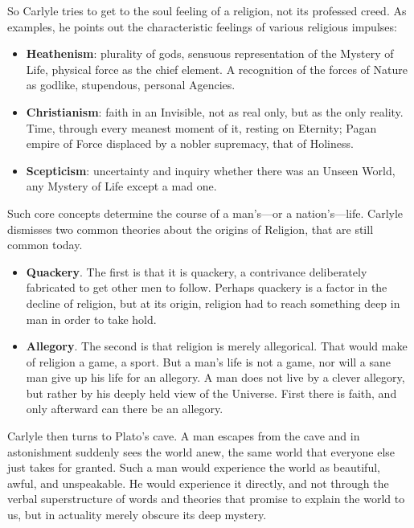 So Carlyle tries to get to the soul feeling of a religion, not its professed creed. As examples, he points out the characteristic feelings of various religious impulses:

\begin{itemize}


\item \textbf{Heathenism}: plurality of gods, sensuous representation of the Mystery of Life, physical force as the chief element. A recognition of the forces of Nature as godlike, stupendous, personal Agencies.

\item \textbf{Christianism}: faith in an Invisible, not as real only, but as the only reality. Time, through every meanest moment of it, resting on Eternity; Pagan empire of Force displaced by a nobler supremacy, that of Holiness.

\item \textbf{Scepticism}: uncertainty and inquiry whether there was an Unseen World, any Mystery of Life except a mad one.
\end{itemize}


Such core concepts determine the course of a man's---or a nation's---life. Carlyle dismisses two common theories about the origins of Religion, that are still common today.

\begin{itemize}


\item \textbf{Quackery}. The first is that it is quackery, a contrivance deliberately fabricated to get other men to follow. Perhaps quackery is a factor in the decline of religion, but at its origin, religion had to reach something deep in man in order to take hold.

\item \textbf{Allegory}. The second is that religion is merely allegorical. That would make of religion a game, a sport. But a man's life is not a game, nor will a sane man give up his life for an allegory. A man does not live by a clever allegory, but rather by his deeply held view of the Universe. First there is faith, and only afterward can there be an allegory.
\end{itemize}


Carlyle then turns to Plato's cave. A man escapes from the cave and in astonishment suddenly sees the world anew, the same world that everyone else just takes for granted. Such a man would experience the world as beautiful, awful, and unspeakable. He would experience it directly, and not through the verbal superstructure of words and theories that promise to explain the world to us, but in actuality merely obscure its deep mystery.


